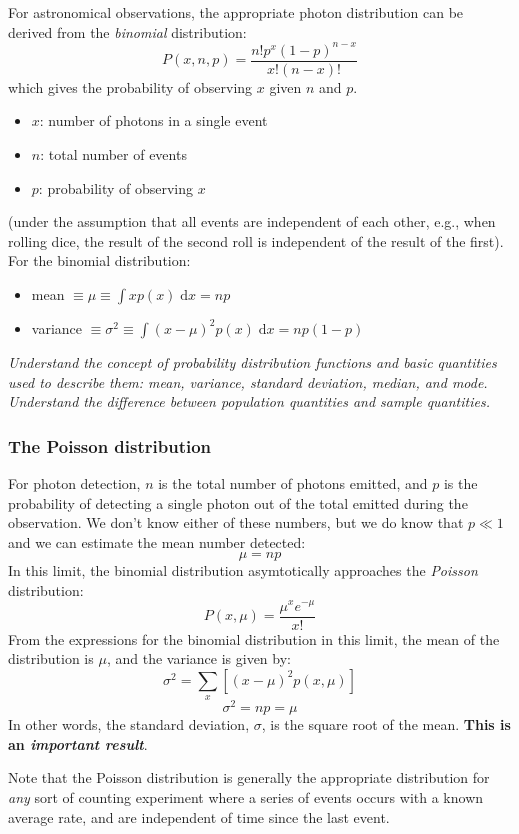 \documentclass[12pt]{article}
\newcommand{\mynotes}[1]{\textcolor{myBlue}{#1}}
\newcommand{\test}[1]{%
    \begin{center}
        {\parbox{0.9\textwidth}{\textit{\small#1}}}
    \end{center}}
\begin{document}
For astronomical observations, the appropriate photon distribution can be derived from the
\textit{binomial} distribution:
\[
    P(x,n,p) = \frac{n!p^{x}(1-p)^{n-x}}{x!(n-x)!}
    \]
which gives the probability of observing $x$ given $n$ and $p$.
\begin{itemize}
    \item $x$: number of photons in a single event
    \item $n$: total number of events
    \item $p$: probability of observing $x$
\end{itemize}
\mynotes{(under the assumption that all events are independent of each other,
e.g., when rolling dice, the result of the second roll is independent of the
result of the first).} For the binomial distribution:
\begin{itemize}
    \item mean $ \equiv \mu \equiv \int{ xp(x) \;\mathrm{d}x} = np $
    \item variance $ \equiv \sigma^{2} \equiv
        \int{ (x - \mu)^{2} p(x) \;\mathrm{d}x = np(1-p) }$
\end{itemize}

\test{Understand the concept of probability distribution functions and basic
quantities used to describe them: mean, variance, standard deviation, median,
and mode. Understand the difference between population quantities and sample
quantities.}

\subsubsection{The Poisson distribution}
For photon detection, $n$ is the total number of
photons emitted, and $p$ is the probability of detecting a
single photon out of the total emitted during the observation.
We don't know either of these numbers, but we do know that
$ p \ll 1 $ and we can estimate the mean number detected:
\[
    \mu = np
    \]
In this limit, the binomial distribution asymtotically approaches the
\textit{Poisson} distribution:
\[
    P(x,\mu) = \frac{\mu^x e^{-\mu}}{x!}
    \]
From the expressions for the binomial distribution in this limit, the
mean of the distribution is $\mu$, and the variance is given by:
\[
    \sigma^{2} = \sum_x [(x-\mu)^{2}p(x,\mu)]
    \]
\[
    \sigma^{2} = np = \mu
    \]
\mynotes{In other words, the standard deviation, $\sigma$, is the square root
of the mean.}
\textbf{This is an \emph{important result}}.

Note that the Poisson distribution is generally the appropriate distribution
for \emph{any} sort of counting experiment where a series of events occurs with
a known average rate, and are independent of time since the last event.
\end{document}
